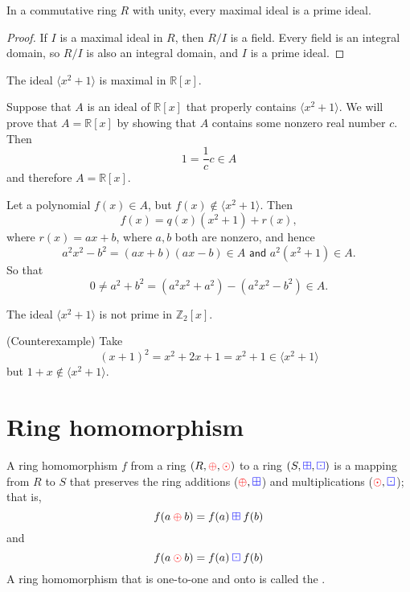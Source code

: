 \begin{corollary}
    In a commutative ring $R$ with unity, every maximal ideal is a prime ideal.
\end{corollary}
\begin{proof}
    If $I$ is a maximal ideal in $R$, then $R/I$ is a field. Every field is an integral domain, so $R/I$ is 
    also an integral domain, and $I$ is a prime ideal.
\end{proof}

\begin{example}
    The ideal $\langle x^2 + 1 \rangle$ is maximal in $\mathbb{R}[x]$.
\end{example}
\begin{solution}
    Suppose that $A$ is an ideal of $\mathbb{R}[x]$ that properly 
    contains $\langle x^2 + 1 \rangle$. We will 
    prove that $A = \mathbb{R}[x]$ by showing that $A$ contains some nonzero real number 
    $c$. Then 
    \[
        1 = \frac{1}{c} c \in A
    \]
    and therefore $A = \mathbb{R}[x]$.

    Let a polynomial $f(x) \in A$, but $f(x) \notin \langle x^2 + 1 \rangle$. Then 
    \[
        f(x) = q(x) (x^2 + 1) + r(x),
    \]
    where $r(x) = ax + b$, where $a,b$ both are nonzero, and hence 
    \[
        a^2 x^2 - b^2 = (ax+b)(ax-b) \in A \textsf{ and } a^2(x^2 + 1) \in A.
    \] 
    So that 
    \[
        0 \neq a^2 + b^2 = (a^2x^2 + a^2) - (a^2x^2 - b^2) \in A.
    \]
\end{solution}

\begin{example}
    The ideal $\langle x^2 + 1 \rangle$ is not prime in $\mathbb{Z}_2[x]$.
\end{example}
\begin{solution}
    (Counterexample) Take 
    \[
        (x+1)^2 = x^2 + 2x + 1 = x^2 + 1 \in \langle x^2 + 1 \rangle
    \]
    but $1 + x \notin \langle x^2 + 1 \rangle$.
\end{solution}

\section{Ring homomorphism}

\begin{definition}
    A ring homomorphism $f$ from a ring $(R, {\color{red} \oplus}, {\color{red} \odot})$ to a ring 
    $(S, {\color{blue} \boxplus}, {\color{blue} \boxdot})$ is a mapping from $R$ to $S$ that preserves the 
    ring additions (${\color{red} \oplus}, {\color{blue} \boxplus}$) and multiplications (${\color{red} \odot}, {\color{blue} \boxdot}$); that is, 
    \begin{equation*}
        f(a \> {\color{red} \oplus} \> b) = f(a) \> {\color{blue} \boxplus} \> f(b) 
    \end{equation*}
    and 
    \begin{equation*}
        f(a \> {\color{red} \odot} \> b) = f(a) \> {\color{blue} \boxdot} \> f(b) 
    \end{equation*}
    A ring homomorphism that is one-to-one and onto is called the .
\end{definition}

